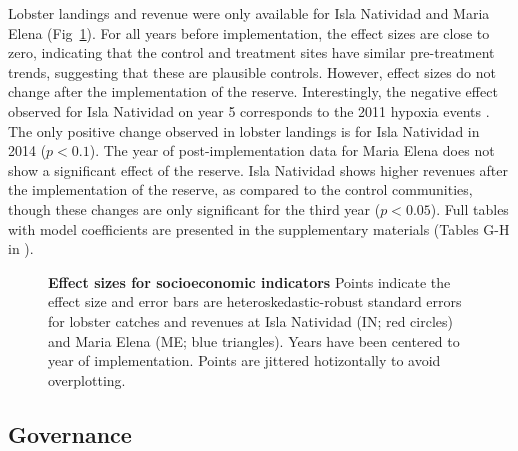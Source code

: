 \documentclass[10pt,letterpaper]{article}
\begin{document}
Lobster landings and revenue were only available for Isla Natividad and Maria Elena (Fig~\ref{fig:lobsters}). For all years before implementation, the effect sizes are close to zero, indicating that the control and treatment sites have similar pre-treatment trends, suggesting that these are plausible controls. However, effect sizes do not change after the implementation of the reserve. Interestingly, the negative effect observed for Isla Natividad on year 5 corresponds to the 2011 hypoxia events \cite{micheli_2012-EU}. The only positive change observed in lobster landings is for Isla Natividad in 2014 ($p < 0.1$). The year of post-implementation data for Maria Elena does not show a significant effect of the reserve. Isla Natividad shows higher revenues after the implementation of the reserve, as compared to the control communities, though these changes are only significant for the third year ($p < 0.05$). Full tables with model coefficients are presented in the supplementary materials (Tables G-H in ).

\begin{figure}[!h]
\centering
\caption{{\bf Effect sizes for socioeconomic indicators}
Points indicate the effect size and error bars are heteroskedastic-robust standard errors for lobster catches and revenues at Isla Natividad (IN; red circles) and Maria Elena (ME; blue triangles). Years have been centered to year of implementation. Points are jittered hotizontally to avoid overplotting.}
\label{fig:lobsters}
\end{figure}

\subsection*{Governance}
\end{document}
